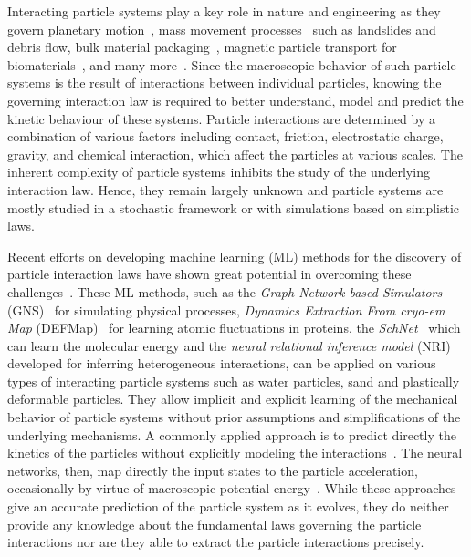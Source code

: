 \documentclass{article}
\begin{document}
Interacting particle systems play a key role in nature and engineering as they govern planetary motion~\cite{murray1999solar}, mass movement processes~\cite{dramis2016mass} such as landslides and debris flow, bulk material packaging~\cite{sawyer2014mechanistic}, magnetic particle transport for biomaterials~\cite{furlani2010magnetic}, and many more~\cite{wang2019coarse, angioletti2017theory}. Since the macroscopic behavior of such particle systems is the result of interactions between individual particles, knowing the governing interaction law is required to better understand, model and predict the kinetic behaviour of these systems. Particle interactions are  determined by a combination of various factors including contact, friction, electrostatic charge, gravity, and chemical interaction, which affect the particles at various scales.
The inherent complexity of particle systems inhibits the study of the underlying interaction law. Hence, they remain largely unknown and particle systems are mostly studied in a stochastic framework or with simulations based on simplistic laws. 

Recent efforts on developing machine learning (ML) methods for the discovery of particle interaction laws have shown great potential in overcoming these challenges~\cite{radovic2018machine, carleo2019machine, zhou2020graph, shlomi2020graph, atz2021geometric, mendez2021geometric, park2021accurate}. These ML methods, such as the \emph{Graph Network-based Simulators} (GNS)~\cite{sanchez2020learning} for simulating physical processes, \emph{Dynamics Extraction From cryo-em Map} (DEFMap)~\cite{matsumoto2021extraction} for learning atomic fluctuations in proteins, the \emph{SchNet}~\cite{schutt2017schnet, schutt2018schnet} which can learn the molecular energy and the \emph{neural relational inference model} (NRI)~\cite{kipf2018neural} developed for inferring heterogeneous interactions, can be applied on various types of interacting particle systems such as water particles, sand and plastically deformable particles. They allow implicit and explicit learning of the mechanical behavior of particle systems without prior assumptions and simplifications of the underlying mechanisms. A commonly applied approach is to predict directly the kinetics of the particles without explicitly modeling the interactions~\cite{schutt2017schnet, unke2019physnet, klicpera2020directional, klicpera2020fast, bapst2020unveiling, sanchez2020learning, hu2021forcenet}. The neural networks, then, map directly the input states to the particle acceleration, occasionally by virtue of macroscopic potential energy~\cite{sanchez2020learning, schutt2017schnet,unke2019physnet, klicpera2020directional, klicpera2020fast}. While these approaches give an accurate  prediction of the particle system as it evolves, they do neither provide any knowledge about the fundamental laws governing the particle interactions nor are they able to extract the particle interactions precisely. 
\end{document}
